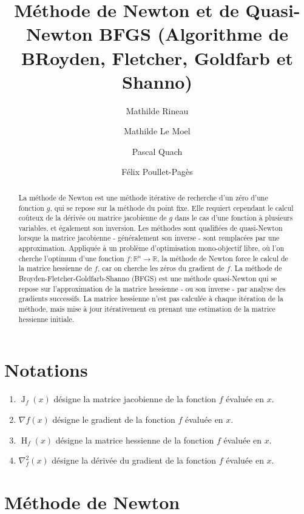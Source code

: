\documentclass[3p, twocolumn]{elsarticle}
\DeclareMathOperator{\Hessian}{H}
\DeclareMathOperator{\Jacobian}{J}
\begin{document}
\nocite{arxiv:kovalev2019stochastic}
\begin{frontmatter}
    \title{Méthode de Newton et de Quasi-Newton BFGS (Algorithme de BRoyden, Fletcher, Goldfarb et Shanno)}
    \author{Mathilde Rineau}
    \author{Mathilde Le Moel}
    \author{Pascal Quach}
    \author{Félix Poullet-Pagès}

    \begin{abstract}
        La méthode de Newton est une méthode itérative de recherche d'un zéro d'une fonction $g$, qui se repose sur la méthode du point fixe. Elle requiert cependant le calcul coûteux de la dérivée ou matrice jacobienne de $g$ dans le cas d'une fonction à plusieurs variables, et également son inversion. Les méthodes sont qualifiées de quasi-Newton lorsque la matrice jacobienne - généralement son inverse - sont remplacées par une approximation. Appliquée à un problème d'optimisation mono-objectif libre, où l'on cherche l'optimum d'une fonction $f:\mathbb{R}^n\rightarrow \mathbb{R}$, la méthode de Newton force le calcul de la matrice hessienne de $f$, car on cherche les zéros du gradient de $f$. La méthode de Broyden-Fletcher-Goldfarb-Shanno (BFGS) est une méthode quasi-Newton qui se repose sur l'approximation de la matrice hessienne - ou son inverse - par analyse des gradients successifs. La matrice hessienne n'est pas calculée à chaque itération de la méthode, mais mise à jour itérativement en prenant une estimation de la matrice hessienne initiale.
    \end{abstract}
\end{frontmatter}

\tableofcontents

\section{Notations}
\begin{enumerate}
    \item $\Jacobian_{f}(x)$ désigne la matrice jacobienne de la fonction $f$ évaluée en $x$.
    \item $\nabla f(x)$ désigne le gradient de la fonction $f$ évaluée en $x$.
    \item $\Hessian_{f}(x)$ désigne la matrice hessienne de la fonction $f$ évaluée en $x$.
    \item $\nabla^2_{f}(x)$ désigne la dérivée du gradient de la fonction $f$ évaluée en $x$.
\end{enumerate}

\section{Méthode de Newton}
\end{document}
